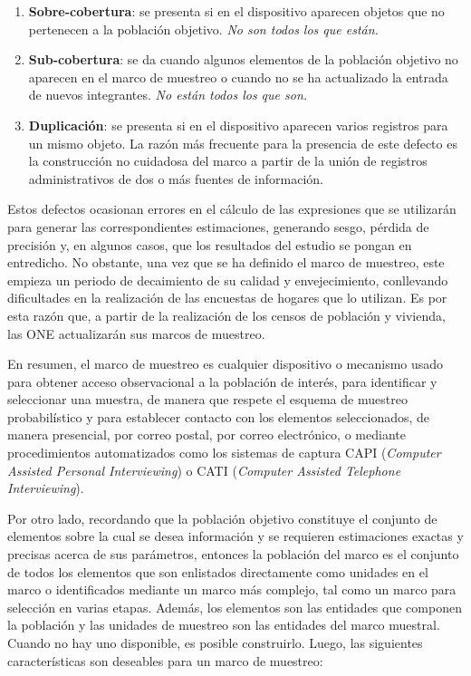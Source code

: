 \documentclass[
  12pt,
  spanish,
]{book}
\providecommand{\tightlist}{%
  \setlength{\itemsep}{0pt}\setlength{\parskip}{0pt}}
\begin{document}
\begin{enumerate}
\def\labelenumi{\arabic{enumi}.}
\tightlist
\item
  \textbf{Sobre-cobertura}: se presenta si en el dispositivo aparecen objetos que no pertenecen a la población objetivo. \emph{No son todos los que están.}
\item
  \textbf{Sub-cobertura}: se da cuando algunos elementos de la población objetivo no aparecen en el marco de muestreo o cuando no se ha actualizado la entrada de nuevos integrantes. \emph{No están todos los que son.}
\item
  \textbf{Duplicación}: se presenta si en el dispositivo aparecen varios registros para un mismo objeto. La razón más frecuente para la presencia de este defecto es la construcción no cuidadosa del marco a partir de la unión de registros administrativos de dos o más fuentes de información.
\end{enumerate}

Estos defectos ocasionan errores en el cálculo de las expresiones que se utilizarán para generar las correspondientes estimaciones, generando sesgo, pérdida de precisión y, en algunos casos, que los resultados del estudio se pongan en entredicho. No obstante, una vez que se ha definido el marco de muestreo, este empieza un periodo de decaimiento de su calidad y envejecimiento, conllevando dificultades en la realización de las encuestas de hogares que lo utilizan. Es por esta razón que, a partir de la realización de los censos de población y vivienda, las ONE actualizarán sus marcos de muestreo.

En resumen, el marco de muestreo es cualquier dispositivo o mecanismo usado para obtener acceso observacional a la población de interés, para identificar y seleccionar una muestra, de manera que respete el esquema de muestreo probabilístico y para establecer contacto con los elementos seleccionados, de manera presencial, por correo postal, por correo electrónico, o mediante procedimientos automatizados como los sistemas de captura CAPI (\emph{Computer Assisted Personal Interviewing}) o CATI (\emph{Computer Assisted Telephone Interviewing}).

Por otro lado, recordando que la población objetivo constituye el conjunto de elementos sobre la cual se desea información y se requieren estimaciones exactas y precisas acerca de sus parámetros, entonces la población del marco es el conjunto de todos los elementos que son enlistados directamente como unidades en el marco o identificados mediante un marco más complejo, tal como un marco para selección en varias etapas. Además, los elementos son las entidades que componen la población y las unidades de muestreo son las entidades del marco muestral. Cuando no hay uno disponible, es posible construirlo. Luego, las siguientes características son deseables para un marco de muestreo:
\end{document}
